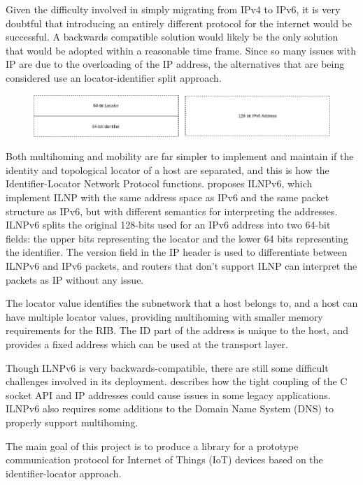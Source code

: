 \documentclass[12pt]{article}
\begin{document}
Given the difficulty involved in simply migrating from IPv4 to IPv6, it is very doubtful that introducing an entirely different protocol for the internet would be successful. A backwards compatible solution would likely be the only solution that would be adopted within a reasonable time frame. Since so many issues with IP are due to the overloading of the IP address, the alternatives that are being considered use an locator-identifier split approach. 

\begin{figure}[!ht]
	\centering
	\includegraphics[width=\linewidth]{images/addresses}
	\caption{}
	\label{fig:addresses}
\end{figure}

Both multihoming and mobility are far simpler to implement and maintain if the identity and topological locator of a host are separated, and this is how the Identifier-Locator Network Protocol functions. \cite{5586444} proposes ILNPv6, which implement ILNP with the same address space as IPv6 and the same packet structure as IPv6, but with different semantics for interpreting the addresses. ILNPv6 splits the original 128-bits used for an IPv6 address into two 64-bit fields: the upper bits representing the locator and the lower 64 bits representing the identifier. The version field in the IP header is used to differentiate between ILNPv6 and IPv6 packets, and routers that don't support ILNP can interpret the packets as IP without any issue. 

The locator value identifies the subnetwork that a host belongs to, and a host can have multiple locator values, providing multihoming with smaller memory requirements for the RIB. The ID part of the address is unique to the host, and provides a fixed address which can be used at the transport layer.

Though ILNPv6 is very backwards-compatible, there are still some difficult challenges involved in its deployment. \cite{ipwithoutip} describes how the tight coupling of the C socket API and IP addresses could cause issues in some legacy applications. ILNPv6 also requires some additions to the Domain Name System (DNS) to properly support multihoming.

The main goal of this project is to produce a library for a prototype communication
protocol for Internet of Things (IoT) devices based on the identifier-locator
approach. 
\end{document}
